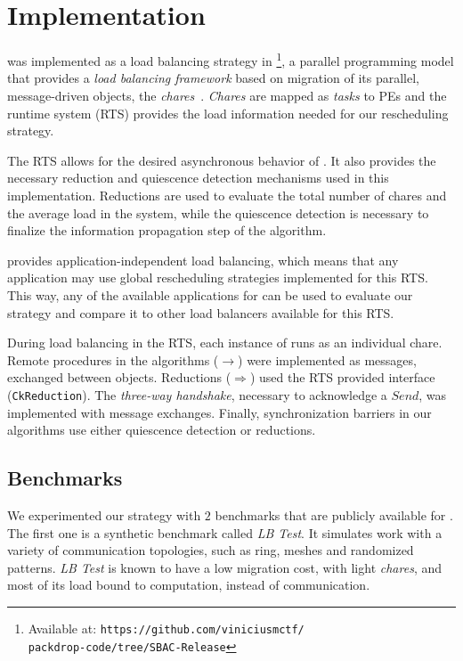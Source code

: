 \section{Implementation} \label{sec:impl}

\packdrop was implemented as a load balancing strategy in \charm\footnote{Available at: \texttt{https://github.com/viniciusmctf/\\packdrop-code/tree/SBAC-Release}}, a parallel programming model that provides a \textit{load balancing framework} based on migration of its parallel, message-driven objects, the \textit{chares}~\cite{CharmLOTR,sc14charm}.
\textit{Chares} are mapped as \textit{tasks} to PEs and the \charm runtime system (RTS) provides the load information needed for our rescheduling strategy.

The \charm RTS allows for the desired asynchronous behavior of \packdrop.
It also provides the necessary reduction and quiescence detection mechanisms used in this implementation.
Reductions are used to evaluate the total number of chares and the average load in the system, while the quiescence detection is necessary to finalize the information propagation step of the algorithm.

\charm provides application-independent load balancing, which means that any application may use global rescheduling strategies implemented for this RTS.
This way, any of the available applications for \charm can be used to evaluate our strategy and compare it to other load balancers available for this RTS.

During load balancing in the \charm RTS, each instance of \packdrop runs as an individual chare.
Remote procedures in the algorithms ($\rightarrow$) were implemented as messages, exchanged between objects.
Reductions ($\Rightarrow$) used the RTS provided interface ({\small\texttt{CkReduction}}).
The \textit{three-way handshake}, necessary to acknowledge a $Send$, was implemented with message exchanges.
Finally, synchronization barriers in our algorithms use either quiescence detection or reductions.

\subsection{Benchmarks} \label{sec:benchmarks}

We experimented our strategy with $2$ benchmarks that are publicly available for \charm.
The first one is a synthetic benchmark called \textit{LB Test}. 
It simulates work with a variety of communication topologies, such as ring, meshes and randomized patterns.
\textit{LB Test} is known to have a low migration cost, with light \textit{chares}, and most of its load bound to computation, instead of communication.

